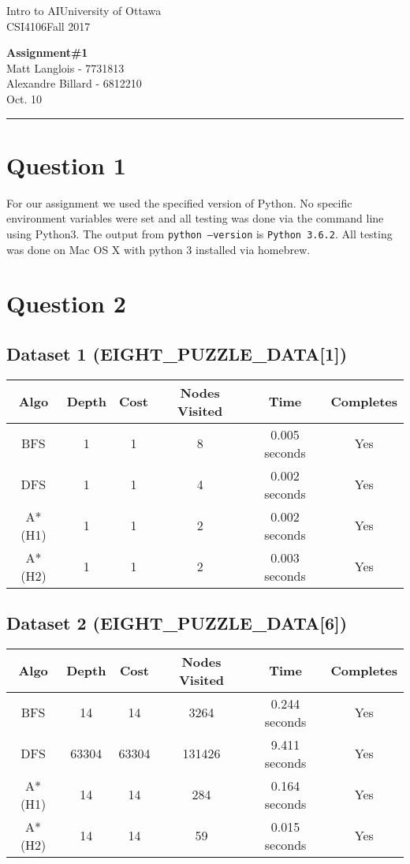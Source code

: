 \documentclass[fleqn, 12pt]{article}
\newcommand{\university}{University of Ottawa}
\newcommand{\name}{Matt Langlois}
\newcommand{\studentNumber}{7731813}
\newcommand{\nameTwo}{Alexandre Billard}
\newcommand{\studentNumberTwo}{6812210}
\newcommand{\semester}{Fall 2017}
\newcommand{\assignmentType}{Assignment}
\newcommand{\assignmentNumber}{1}
\newcommand{\dueDate}{Oct. 10}
\newcommand{\courseCode}{CSI4106}
\newcommand{\courseTitle}{Intro to AI}
\newcommand{\essayTitle}{<Title>} %
\newcommand{\essaySubtitle}{<subtitle>} %
\newcommand{\essayAbstract}{} %
\newcommand{\code}[1]{\colorbox{codegray}{\texttt{#1}}}
\newcommand{\beginassignemnt}{
    \newlength\tindent
    \setlength{\tindent}{\parindent}
    \setlength{\parindent}{0pt}

    \thispagestyle{assignment}
    \noindent
    \courseTitle \hfill \university\\
    \courseCode \hfill \semester
    \begin{center}
        \textbf{\assignmentType\text{ }\#\assignmentNumber}\\
        \name \hspace{1pt} - \studentNumber\\
        \nameTwo \hspace{1pt} - \studentNumberTwo\\
        \dueDate\\
    \end{center}
    \vspace{6pt}
    \hrule
    \vspace{1.5\headsep}
}
\newcommand{\beginessay}{
    \nocite{*}

    \pagestyle{frontmatter}
    \pagenumbering{roman}

    \begin{center}
        \normalsize
        \textsc{\university}\\[5cm]
        \LARGE \textbf{\MakeUppercase{\essayTitle}}\\[0.5cm]
        \large \text{ }\essaySubtitle\text{ }\\[10cm] %
        \normalsize
        \textsc{\name}\\
        \textsc{\studentNumber}\\
        \textsc{\courseCode}\\
        \textsc{\semester}\\
        \textsc{\dueDate}
    \end{center}
    \thispagestyle{empty}

    \newpage
    \tableofcontents
    \newpage

    \iftotalfigures
        \addcontentsline{toc}{section}{\listfigurename}
        \listoffigures
    \fi
    \iftotaltables
        \addcontentsline{toc}{section}{\listtablename}
        \listoftables
    \fi

    \ifdefempty{\essayAbstract}{}{
        \newpage
        \addcontentsline{toc}{section}{Abstract}
        \begin{abstract}
            \essayAbstract
        \end{abstract}

    }
    \label{EndFrontMatter}
    \newpage

    \pagenumbering{arabic}
    \pagestyle{body}
}
\begin{document}
\beginassignemnt


\section*{Question 1}

For our assignment we used the specified version of Python. No specific environment variables were set and all testing was done via the command line using Python3. The output from \code{python --version} is \code{Python 3.6.2}. All testing was done on Mac OS X with python 3 installed via homebrew.

\section{Question 2}

\subsection*{Dataset 1 (EIGHT\_PUZZLE\_DATA[1])}

\begin{tabular}{|c|c|c|c|c|c|}
    \hline
        Algo & Depth & Cost & Nodes Visited & Time & Completes  \\\hline
        BFS  & 1 & 1 & 8 & 0.005 seconds & Yes \\\hline
        DFS  & 1 & 1 & 4 & 0.002 seconds & Yes \\\hline
        A* (H1)  & 1 & 1 & 2 & 0.002 seconds & Yes \\\hline
        A* (H2)  & 1 & 1 & 2 & 0.003 seconds & Yes \\
    \hline
\end{tabular}

\subsection*{Dataset 2 (EIGHT\_PUZZLE\_DATA[6])}

\begin{tabular}{|c|c|c|c|c|c|}
    \hline
        Algo & Depth & Cost & Nodes Visited & Time & Completes  \\\hline
        BFS  & 14 & 14 & 3264 & 0.244 seconds & Yes \\\hline
        DFS  & 63304 & 63304 & 131426 & 9.411 seconds & Yes \\\hline
        A* (H1)  & 14 & 14 & 284 & 0.164 seconds & Yes \\\hline
        A* (H2)  & 14 & 14 & 59 & 0.015 seconds & Yes \\
    \hline
\end{tabular}
\end{document}
